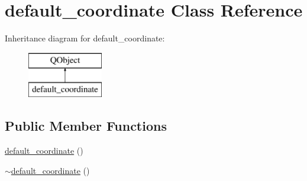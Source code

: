 \hypertarget{classdefault__coordinate}{\section{default\-\_\-coordinate Class Reference}
\label{classdefault__coordinate}
}
Inheritance diagram for default\-\_\-coordinate\-:\begin{figure}[H]
\begin{center}
\leavevmode
\includegraphics[height=2.000000cm]{classdefault__coordinate}
\end{center}
\end{figure}
\subsection*{Public Member Functions}
\begin{DoxyCompactItemize}
\item 
\hyperlink{classdefault__coordinate_a34568bfc14507a9621db3d8c3a7d689c}{default\-\_\-coordinate} ()
\item 
\hyperlink{classdefault__coordinate_a574a76c27abca08cb68d259024350b48}{$\sim$default\-\_\-coordinate} ()
\end{DoxyCompactItemize}
